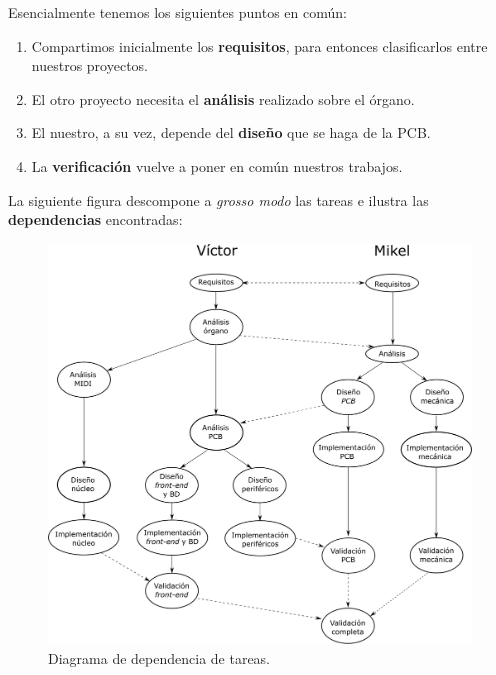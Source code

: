 Esencialmente tenemos los siguientes puntos en común:

\begin{enumerate}
	\item Compartimos inicialmente los \textbf{requisitos}, para entonces clasificarlos entre nuestros proyectos.
	\item El otro proyecto necesita el \textbf{análisis} realizado sobre el órgano.
	\item El nuestro, a su vez, depende del \textbf{diseño} que se haga de la \acrshort{PCB}.
	\item La \textbf{verificación} vuelve a poner en común nuestros trabajos.
\end{enumerate}

La siguiente figura descompone a \textit{grosso modo} las tareas e ilustra las \textbf{dependencias} encontradas:

\smallskip

\begin{figure}[H]
	\noindent \begin{centering}
		\includegraphics[width=\linewidth*3/4]{capitulo5/planificacion}
		\par\end{centering}
	\smallskip
	\caption{\label{fig:planificacion} Diagrama de dependencia de tareas.}
\end{figure} 


